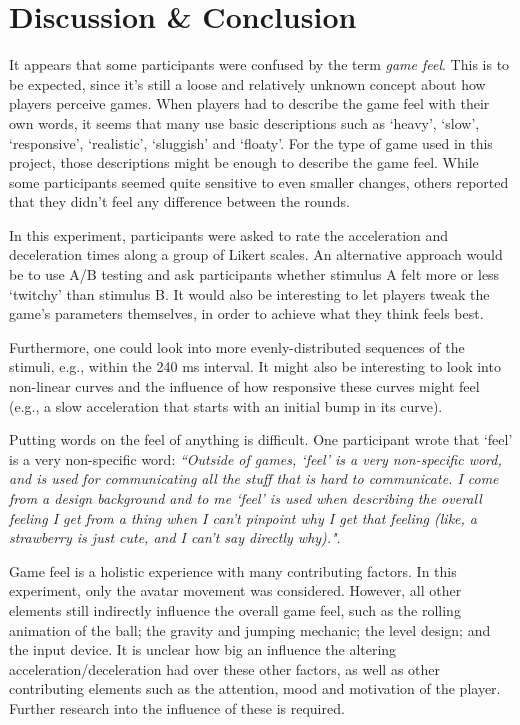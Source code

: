 \section{Discussion \& Conclusion} \label{discussion}
It appears that some participants were confused by the term \textit{game feel}. This is to be expected, since it's still a loose and relatively unknown concept about how players perceive games. When players had to describe the game feel with their own words, it seems that many use basic descriptions such as `heavy', `slow', `responsive', `realistic', `sluggish' and `floaty'. For the type of game used in this project, those descriptions might be enough to describe the game feel. While some participants seemed quite sensitive to even smaller changes, others reported that they didn't feel any difference between the rounds.

In this experiment, participants were asked to rate the acceleration and deceleration times along a group of Likert scales. An alternative approach would be to use A/B testing and ask participants whether stimulus A felt more or less `twitchy' than stimulus B. It would also be interesting to let players tweak the game's parameters themselves, in order to achieve what they think feels best.

Furthermore, one could look into more evenly-distributed sequences of the stimuli, e.g., within the 240 ms interval. It might also be interesting to look into non-linear curves and the influence of how responsive these curves might feel (e.g., a slow acceleration that starts with an initial bump in its curve).

Putting words on the feel of anything is difficult. One participant wrote that `feel' is a very non-specific word: \textit{``Outside of games, `feel' is a very non-specific word, and is used for communicating all the stuff that is hard to communicate. I come from a design background and to me `feel' is used when describing the overall feeling I get from a thing when I can't pinpoint why I get that feeling (like, a strawberry is just cute, and I can't say directly why)."}.

Game feel is a holistic experience with many contributing factors. In this experiment, only the avatar movement was considered. However, all other elements still indirectly influence the overall game feel, such as the rolling animation of the ball; the gravity and jumping mechanic; the level design; and the input device. It is unclear how big an influence the altering acceleration/deceleration had over these other factors, as well as other contributing elements such as the attention, mood and motivation of the player. Further research into the influence of these is required.
